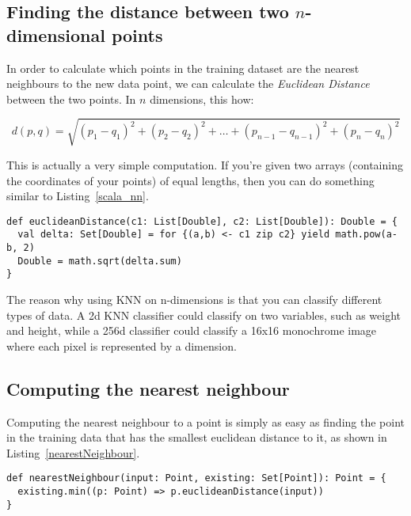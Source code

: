 \subsection{Finding the distance between two $n$-dimensional points}

In order to calculate which points in the training dataset are the nearest
neighbours to the new data point, we can calculate the {\it Euclidean Distance}
between the two points. In $n$ dimensions, this how:

\[
  d(p,q) = \sqrt{(p_1 - q_1)^2 + (p_2 - q_2)^2 + \dots + (p_{n-1} - q_{n-1})^2 + (p_n - q_n)^2}
\]

This is actually a very simple computation. If you're given two arrays
(containing the coordinates of your points) of equal lengths, then you can do
something similar to Listing~\ref{scala_nn}.

\begin{lstlisting}[label=scala_nn, caption=Scala Euclidean Distance]
def euclideanDistance(c1: List[Double], c2: List[Double]): Double = {
  val delta: Set[Double] = for {(a,b) <- c1 zip c2} yield math.pow(a-b, 2)
  Double = math.sqrt(delta.sum)
}
\end{lstlisting}

The reason why using KNN on n-dimensions is that you can classify different
types of data. A 2d KNN classifier could classify on two variables, such as
weight and height, while a 256d classifier could classify a 16x16 monochrome
image where each pixel is represented by a dimension.

\subsection{Computing the nearest neighbour}

Computing the nearest neighbour to a point is simply as easy as finding the point
in the training data that has the smallest euclidean distance to it, as shown in
Listing~\ref{nearestNeighbour}.

\begin{lstlisting}[label=nearestNeighbour, caption=Scala Nearest Neighbour]
def nearestNeighbour(input: Point, existing: Set[Point]): Point = {
  existing.min((p: Point) => p.euclideanDistance(input))
}
\end{lstlisting}


